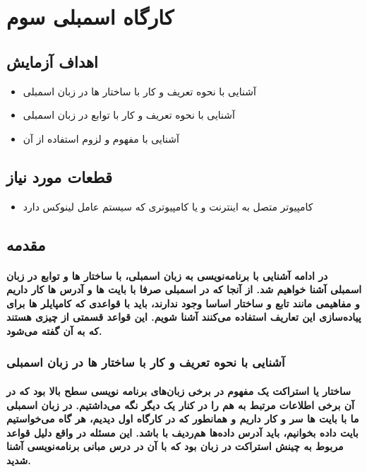 \section{کارگاه اسمبلی سوم}

\subsection{اهداف آزمایش}
\begin{itemize}
    \item آشنایی با نحوه تعریف و کار با ساختار ها در زبان اسمبلی
    \item آشنایی با نحوه تعریف و کار با توابع در زبان اسمبلی
    \item آشنایی با مفهوم  و لزوم استفاده از آن
\end{itemize}

\subsection{قطعات مورد نیاز}
\begin{itemize}
    \item کامپیوتر متصل به اینترنت و یا کامپیوتری که سیستم عامل لینوکس دارد
\end{itemize}

\subsection{مقدمه}

\paragraph{
در ادامه آشنایی با برنامه‌نویسی به زبان اسمبلی، با ساختار ها و توابع در زبان اسمبلی آشنا خواهیم شد. از آنجا که در اسمبلی صرفا با بایت ها و آدرس ها کار داریم و مفاهیمی مانند تابع و ساختار اساسا وجود ندارند، باید با قواعدی که کامپایلر ها برای پیاده‌سازی این تعاریف استفاده می‌کنند آشنا شویم. این قواعد قسمتی از چیزی هستند که به آن  گفته می‌شود.
}

\subsubsection{آشنایی با نحوه تعریف و کار با ساختار ها در زبان اسمبلی}

\paragraph{
ساختار یا استراکت یک مفهوم در برخی زبان‌های برنامه نویسی سطح بالا بود که در آن برخی اطلاعات مرتبط به هم را در کنار یک دیگر نگه می‌داشتیم. در زبان اسمبلی ما با بایت ها سر و کار داریم و همانطور که در کارگاه اول دیدیم، هر گاه می‌خواستیم  بایت داده بخوانیم، باید آدرس داده‌ها هم‌ردیف با  باشد. این مسئله در واقع دلیل قواعد مربوط به چینش استراکت در زبان  بود که با آن در درس مبانی برنامه‌نویسی آشنا شدید.
}

